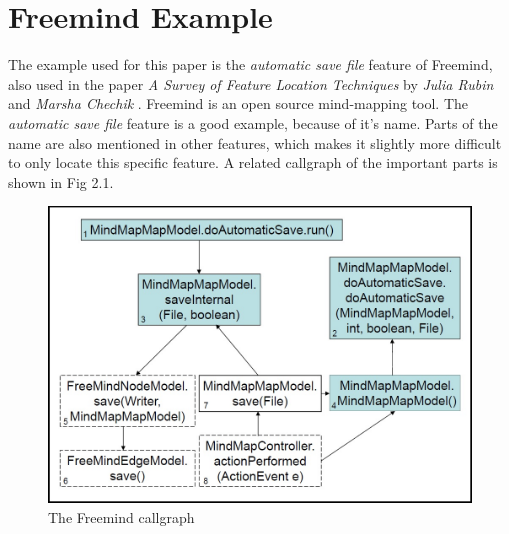 \chapter{Freemind Example}
\label{ch:Freemind Example}

The example used for this paper is the \textit{automatic save file} feature of Freemind, also used in the paper \emph{A Survey of Feature Location Techniques} by \textit{Julia Rubin} and \textit{Marsha Chechik} \cite{rubin2013survey}. Freemind is an open source  mind-mapping tool. The \textit{automatic save file} feature is a good example, because of it's name. Parts of the name are also mentioned in other features, which makes it slightly more difficult to only locate this specific feature.
A related callgraph of the important parts is shown in Fig 2.1.

\begin{figure}
  \centering
  \includegraphics[width=\linewidth]{src/pic/freemind_callgraph}
  \caption{The Freemind callgraph \cite{FrM16} \cite{rubin2013survey}}
  \label{pic:freemind callgraph}
\end{figure}

